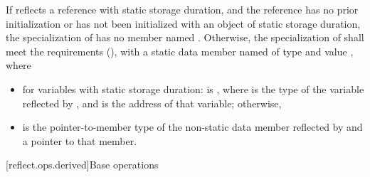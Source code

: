\begin{std.txt}
\begin{itemdescr}
\pnum
If  reflects a reference with static storage duration, and the reference has no prior initialization or has not been initialized with an object of static storage duration, the specialization of  has no member named . Otherwise, the specialization
of  shall meet the  requirements (), with a static data member named  of type  and value , where
\begin{itemize}
  \item for variables with static storage duration:  is , where  is the type of the variable reflected by , and  is the address of that variable; otherwise,
  \item {} is the pointer-to-member type of the non-static data member reflected by  and  a pointer to that member.
\end{itemize}
\end{itemdescr}
\end{std.txt}

[reflect.ops.derived]{Base operations}

